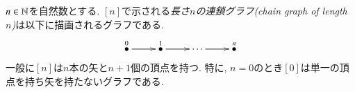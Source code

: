 \begin{example}\label{ex:[n] as graph}


$n\in{\mathbb N}$を自然数とする. $[n]$で示される\emph{長さ$n$の連鎖グラフ(chain graph of length $n$)}は以下に描画されるグラフである.
$$
\xymatrix{
\LMO{0}\ar[r]&\LMO{1}\ar[r]&\cdots\ar[r]&\LMO{n}
}
$$
一般に$[n]$は$n$本の矢と$n+1$個の頂点を持つ. 特に, $n=0$のとき$[0]$は単一の頂点を持ち矢を持たないグラフである.

\end{example}

